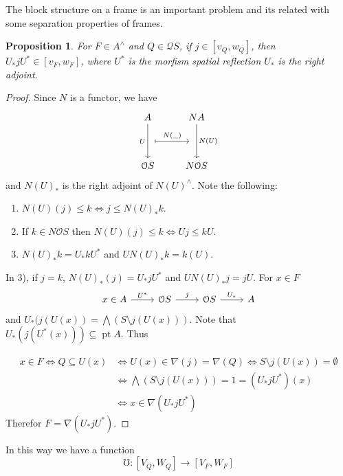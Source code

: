 \documentclass[11pt]{amsart}
\DeclareMathOperator{\pt}{pt}
\theoremstyle{plain}
\newtheorem{prop}[thm]{Proposition}
\theoremstyle{definition}
\begin{document}
The block structure on a frame is an important problem and its related with some separation properties of frames.

\begin{prop}\label{morfismo}
For $F\in A^\wedge$ and $Q\in\mathcal{Q}S$, if $j\in [v_Q, w_Q]$, then $U_*jU^*\in [v_F, w_F]$, where $U^*$ is the morfism spatial reflection $U_*$ is the right adjoint.
\end{prop}

\begin{proof}
Since $N$ is a functor, we have 
\[\begin{tikzcd}
	A & NA \\
	\\
	{\mathcal{O}S} & {N\mathcal{O}S}
	\arrow[""{name=0, anchor=center, inner sep=0}, "U"', from=1-1, to=3-1]
	\arrow[""{name=1, anchor=center, inner sep=0}, "{N(U)}", from=1-2, to=3-2]
	\arrow["{N(\_)}", shorten <=7pt, shorten >=7pt, maps to, from=0, to=1]
\end{tikzcd}\]
and $N(U)_*$ is the right adjoint of $N(U)^\wedge$. Note the following:
\begin{enumerate}
	\item $N(U)(j)\leq k\Leftrightarrow j\leq N(U)_*k$.
	\item If $k\in N\mathcal{O}S$ then $N(U)(j)\leq k\Leftrightarrow Uj\leq kU$.
	\item $N(U)_*k=U_*kU^*$ and $UN(U)_*k=k(U)$.
\end{enumerate}
In 3), if $j=k$, $N(U)_*(j)=U_*jU^*$ and $UN(U)_*j=jU$. For $x\in F$
\[\begin{tikzcd}
	x\in A & {\mathcal{O}S} & {\mathcal{O}S} & A
	\arrow["{U^*}", from=1-1, to=1-2]
	\arrow["j", from=1-2, to=1-3]
	\arrow["{U_*}", from=1-3, to=1-4]
\end{tikzcd}\]
and $U_*(j(U(x))=\bigwedge(S\setminus j(U(x)))$. Note that $U_*(j(U^*(x)))\subseteq \pt A$. Thus

\[
\begin{split}
x\in F \Leftrightarrow Q\subseteq U(x) &\Leftrightarrow U(x)\in \nabla(j)=\nabla(Q)\Leftrightarrow S\setminus j(U(x))=\emptyset\\
& \Leftrightarrow \bigwedge (S\setminus j(U(x)))=1=(U_*jU^*)(x)\\
&\Leftrightarrow x\in \nabla(U_*jU^*)
\end{split}
\]
Therefor $F=\nabla(U_*jU^*)$.
\end{proof}
In this way we have a function 
\[
\mho\colon [V_Q, W_Q]\to [V_F, W_F]
\]
\end{document}

